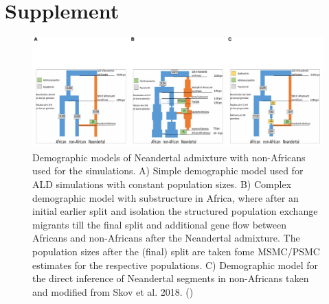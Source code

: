 \documentclass[]{article}
\begin{document}
\hypertarget{refs}{}




\pagebreak
\setcounter{figure}{0} \renewcommand{\figurename}{Fig. S}
\renewcommand{\tablename}{Tab. S}

\section{Supplement}\label{supplement}

\begin{figure}
\centering
\includegraphics{Admixture_Time_Inference_Paper_Draft_files/figure-latex/figS1-1.pdf}
\caption{\label{fig:figS1} Demographic models of Neandertal admixture with non-Africans used for the simulations. A) Simple demographic model used for ALD simulations with constant population sizes. B) Complex demographic model with substructure in Africa, where after an initial earlier split and isolation the structured population exchange migrants till the final split and additional gene flow between Africans and non-Africans after the Neandertal admixture. The  population sizes after the (final) split are taken fome MSMC/PSMC estimates for the respective populations. C) Demographic model for the direct inference of Neandertal segments in non-Africans taken and modified from Skov et al. 2018. (\citep{skov_detecting_2018})}
\end{figure}
\end{document}
